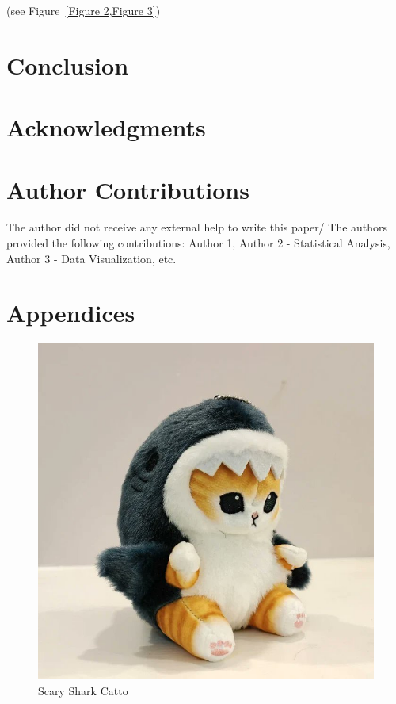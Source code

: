 \documentclass[	DIV=calc,%
							paper=a4,%
							fontsize=12pt,%
							twocolumn]{scrartcl}	 					%
\begin{document}
\lipsum[5](see Figure~\ref{Figure 2,Figure 3})

\section*{Conclusion}
\; \; %
\lipsum[8]

\lipsum[8]

\lipsum[8]

\section*{Acknowledgments}
\; \; %
\lipsum[1]

\section*{Author Contributions}
\; \; %
The author did not receive any external help to write this paper/ The authors provided the following contributions: Author 1, Author 2 - Statistical Analysis, Author 3 - Data Visualization, etc.


\section*{Appendices}
\lipsum[1]


\begin{figure}[H] %
    \centering
    \includegraphics[width=\columnwidth]{catto.png}
    \caption{Scary Shark Catto}
    \label{Figure 3}
\end{figure}
\end{document}
